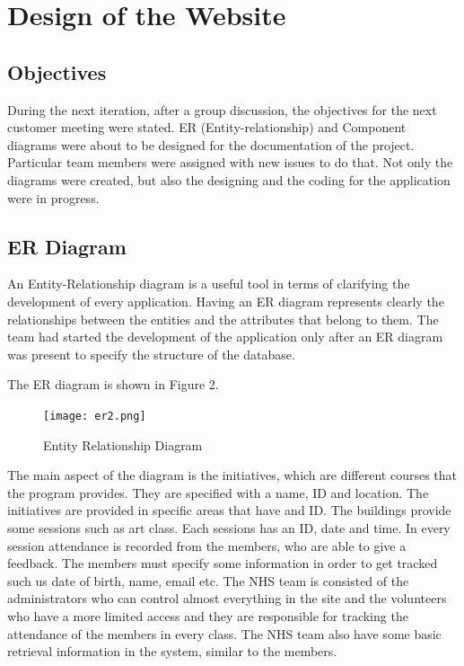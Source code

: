 \documentclass{l3proj}
\begin{document}
\section{Design of the Website}
\label{sec:design}

\subsection{Objectives}
\label{sec:objectives}

During the next iteration, after a group discussion, the objectives for the next customer meeting were stated. ER (Entity-relationship) and Component diagrams were about to be designed for the documentation of the project. Particular team members were assigned with new issues to do that. Not only the diagrams were created, but also the designing and the coding for the application were in progress.  

\subsection{ER Diagram}
\label{sec:er}

An Entity-Relationship diagram \cite{er} is a useful tool in terms of clarifying the development of every application. Having an ER diagram represents clearly the relationships between the entities and the attributes that belong to them. The team had started the development of the application only after an ER diagram was present to specify the structure of the database. 

The ER diagram is shown in Figure 2.

\begin{figure}
 \centerline{\texttt{[image: er2.png]}}
 \caption{Entity Relationship Diagram}
 \label{fig:er}
\end{figure}

The main aspect of the diagram is the initiatives, which are different courses that the program provides. They are specified with a name, ID and location. The initiatives are provided in specific areas that have and ID. The buildings provide some sessions such as art class. Each sessions has an ID, date and time. In every session attendance is recorded from the members, who are able to give a feedback. The members must specify some information in order to get tracked such us date of birth, name, email etc. The NHS team is consisted of the administrators who can control almost everything in the site and the volunteers who have a more limited access and they are responsible for tracking the attendance of the members in every class. The NHS team also have some basic retrieval information in the system, similar to the members.
\end{document}

